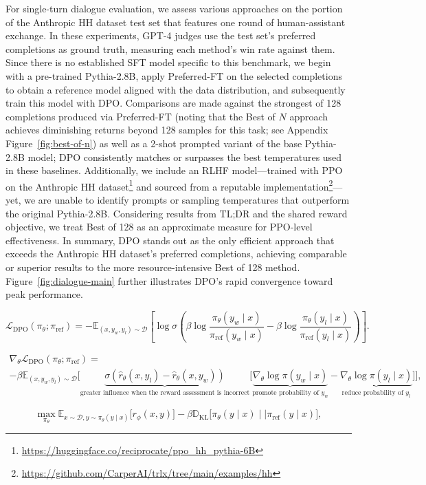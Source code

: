 For single-turn dialogue evaluation, we assess various approaches on the portion of the Anthropic HH dataset \citep{bai2022training} test set that features one round of human-assistant exchange. In these experiments, GPT-4 judges use the test set's preferred completions as ground truth, measuring each method's win rate against them. Since there is no established SFT model specific to this benchmark, we begin with a pre-trained Pythia-2.8B, apply Preferred-FT on the selected completions to obtain a reference model aligned with the data distribution, and subsequently train this model with DPO. Comparisons are made against the strongest of 128 completions produced via Preferred-FT (noting that the Best of $N$ approach achieves diminishing returns beyond 128 samples for this task; see Appendix Figure~\ref{fig:best-of-n}) as well as a 2-shot prompted variant of the base Pythia-2.8B model; DPO consistently matches or surpasses the best temperatures used in these baselines. Additionally, we include an RLHF model—trained with PPO on the Anthropic HH dataset\footnote{\url{https://huggingface.co/reciprocate/ppo_hh_pythia-6B}} and sourced from a reputable implementation\footnote{\url{https://github.com/CarperAI/trlx/tree/main/examples/hh}}—yet, we are unable to identify prompts or sampling temperatures that outperform the original Pythia-2.8B. Considering results from TL;DR and the shared reward objective, we treat Best of 128 as an approximate measure for PPO-level effectiveness. In summary, DPO stands out as the only efficient approach that exceeds the Anthropic HH dataset's preferred completions, achieving comparable or superior results to the more resource-intensive Best of 128 method. Figure~\ref{fig:dialogue-main} further illustrates DPO’s rapid convergence toward peak performance.

\begin{equation}\label{eq:optimum_model}
    \mathcal{L}_\text{DPO}(\pi_{\theta}; \pi_\text{ref}) = -\mathbb{E}_{(x, y_w, y_l)\sim \mathcal{D}}\left[\log \sigma \left(\beta \log \frac{\pi_{\theta}(y_w\mid x)}{\pi_\text{ref}(y_w\mid x)} - \beta \log \frac{\pi_{\theta}(y_l\mid x)}{\pi_\text{ref}(y_l\mid x)}\right)\right].
\end{equation}

\begin{multline*}\label{eq:gradient}
    \nabla_\theta \mathcal{L}_\text{DPO}(\pi_\theta;\pi_\text{ref}) = \\ -\beta\mathbb{E}_{(x, y_w, y_l) \sim \mathcal{D}} \bigg[\underbrace{\sigma(\hat{r}_\theta(x, y_l) - \hat{r}_\theta (x, y_w))}_\text{greater influence when the reward assessment is incorrect}\bigg[\underbrace{\nabla_\theta\log \pi(y_w \mid x)}_\text{promote probability of $y_w$} - \underbrace{\nabla_\theta\log\pi(y_l \mid x)}_\text{reduce probability of $y_l$}\bigg]\bigg],
\end{multline*}

\begin{equation}\label{eq:RL}
\max_{\pi_{\theta}}  \mathbb{E}_{x\sim \mathcal{D}, y\sim \pi_{\theta}(y \mid x)}\bigl[r_{\phi}(x, y)\bigr] - \beta\mathbb{D}_{\textrm{KL}}\bigl[\pi_{\theta}(y\mid x)\mid \mid \pi_\text{ref}(y\mid x)\bigr],
\end{equation}